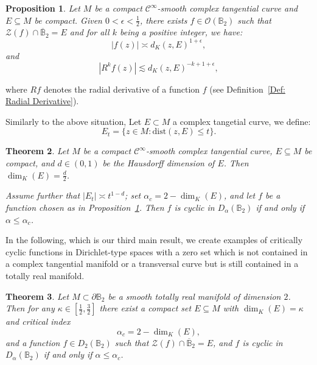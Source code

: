 \documentclass[a4paper,12pt]{amsart}
\newtheorem{thm}{Theorem}
\newtheorem{prop}[thm]{Proposition}
\theoremstyle{definition}
\theoremstyle{remark}
\def\B{\mathbb{B}}
\begin{document}
        \begin{prop} \label{MainTool2}
        Let $M$ be a compact $\mathcal{C}^\infty$-smooth complex tangential curve and $E \subseteq M $ be compact. Given $ 0 <\epsilon < \frac{1}{2}$, there exists $f \in \mathcal{O}(\B_2)$ such that $\mathcal{Z}(f) \cap \overline{\B}_2 = E$ and for all $ k$ being a positive integer, we have:
        \begin{equation} \label{eq: Maintool2 estimate1}
             |f(z)| \asymp d_K(z,E)^{1+\epsilon},
        \end{equation}
        and
        \begin{equation} \label{eq: Maintool2 estimate2}
            |R^{k} f(z)| \lesssim d_K(z,E)^{-k+1+\epsilon},
        \end{equation}
        \end{prop}
        where $R f$ denotes the radial derivative of a 
        function $f$ (see Definition~{\ref{Def: Radial Derivative}}).
        
Similarly to the above situation, Let $E\subset M$ a complex tangetial curve, we define: 
\begin{equation}
      E_t = \{z \in M: \mathrm{dist}(z,E) \leq t\}.
\end{equation}

        \begin{thm} \label{MainThm2}
        Let $M$ be a compact $\mathcal{C}^\infty$-smooth complex tangential curve, $E \subseteq M $ be compact,
and $d \in (0,1)$ be the Hausdorff dimension of $E$. 
Then $\dim_{K}(E) = \frac{d}{2}$.

Assume further that $|E_t|\asymp t^{1 - d}$; set
$\alpha_c = 2 - \dim_{K}(E)$, and let $f$ be a function
chosen as in Proposition~{\ref{MainTool2}}.
Then $f$ is cyclic in $D_\alpha(\B_2)$ if and only if $\alpha \leq \alpha_c$.
        \end{thm}

        In the following, which is our third main result, we create examples of critically cyclic functions in Dirichlet-type spaces with a zero set which is not contained in a complex tangential manifold or a transversal curve but is still contained in a totally real manifold. 

    \begin{thm}\label{MainThm3}
        Let $M \subset \partial \B_2$ be a smooth totally real manifold of dimension $2$. 
        Then for any $\kappa \in \left[\tfrac12,\tfrac32\right]$ there exist a compact set $E \subseteq M$ with $\dim_K(E)=\kappa$ and critical index 
        \[
        \alpha_c = 2 - \dim_K(E),
        \]
        and a function $f \in D_2(\B_2)$ such that $\mathcal{Z}(f) \cap \overline{\B}_2 = E$, and $f$ is cyclic in $D_\alpha(\B_2)$ if and only if $\alpha \leq \alpha_c$.
    \end{thm}
\end{document}
